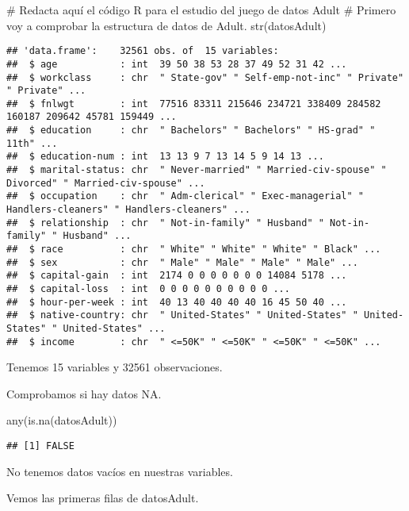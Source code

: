 \documentclass[]{article}
\newenvironment{Shaded}{\begin{snugshade}}{\end{snugshade}}
\newcommand{\CommentTok}[1]{\textcolor[rgb]{0.50,0.62,0.50}{#1}}
\newcommand{\KeywordTok}[1]{\textcolor[rgb]{0.94,0.87,0.69}{#1}}
\newcommand{\NormalTok}[1]{\textcolor[rgb]{0.80,0.80,0.80}{#1}}
\begin{document}
\begin{Shaded}
\begin{Highlighting}[]
\CommentTok{\# Redacta aquí el código R para el estudio del juego de datos Adult}
\CommentTok{\# Primero voy a comprobar la estructura de datos de Adult.}
\KeywordTok{str}\NormalTok{(datosAdult)}
\end{Highlighting}
\end{Shaded}

\begin{verbatim}
## 'data.frame':    32561 obs. of  15 variables:
##  $ age           : int  39 50 38 53 28 37 49 52 31 42 ...
##  $ workclass     : chr  " State-gov" " Self-emp-not-inc" " Private" " Private" ...
##  $ fnlwgt        : int  77516 83311 215646 234721 338409 284582 160187 209642 45781 159449 ...
##  $ education     : chr  " Bachelors" " Bachelors" " HS-grad" " 11th" ...
##  $ education-num : int  13 13 9 7 13 14 5 9 14 13 ...
##  $ marital-status: chr  " Never-married" " Married-civ-spouse" " Divorced" " Married-civ-spouse" ...
##  $ occupation    : chr  " Adm-clerical" " Exec-managerial" " Handlers-cleaners" " Handlers-cleaners" ...
##  $ relationship  : chr  " Not-in-family" " Husband" " Not-in-family" " Husband" ...
##  $ race          : chr  " White" " White" " White" " Black" ...
##  $ sex           : chr  " Male" " Male" " Male" " Male" ...
##  $ capital-gain  : int  2174 0 0 0 0 0 0 0 14084 5178 ...
##  $ capital-loss  : int  0 0 0 0 0 0 0 0 0 0 ...
##  $ hour-per-week : int  40 13 40 40 40 40 16 45 50 40 ...
##  $ native-country: chr  " United-States" " United-States" " United-States" " United-States" ...
##  $ income        : chr  " <=50K" " <=50K" " <=50K" " <=50K" ...
\end{verbatim}

Tenemos 15 variables y 32561 observaciones.

Comprobamos si hay datos NA.

\begin{Shaded}
\begin{Highlighting}[]
\KeywordTok{any}\NormalTok{(}\KeywordTok{is.na}\NormalTok{(datosAdult))}
\end{Highlighting}
\end{Shaded}

\begin{verbatim}
## [1] FALSE
\end{verbatim}

No tenemos datos vacíos en nuestras variables.

Vemos las primeras filas de datosAdult.
\end{document}

